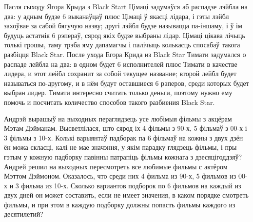 \begin{problemList}
\bigskip

\problemItemSimple
{Пасля сыходу Ягора Крыда з Black Start Цімаці задумаўся аб распадзе лэйбла на два:
у адным будзе 6 выканаўцаў плюс Цімаці ў якасці лідара, і гэты лэйбл захоўвае за сабой бягучую назву;
другі лэйбл будзе называцца па-іншаму, і ў ім будуць астатнія 6 рэпераў, сярод якіх будзе выбраны лідар.
Цімаці цікава лічыць толькі грошы, таму трэба яму дапамагчы і палічыць колькасць спосабаў такога разбіцця Black Star.}
{После ухода Егора Крида из Black Star Тимати задумался о распаде лейбла на два:
в одном будет 6 исполнителей плюс Тимати в качестве лидера, и этот лейбл сохранит за собой текущее название;
второй лейбл будет называться по-другому, и в нём будут оставшиеся 6 рэперов, среди которых будет выбран лидер.
Тимати интересно считать только деньги, поэтому нужно ему помочь и посчитать количество способов такого разбиения Black Star.}

\bigskip

\problemItemSimple
{Андрэй вырашыў на выходных пераглядзець усе любімыя фільмы з акцёрам Мэтам Дэйманам.
Высветлілася, што сярод іх 4 фільмы з 90-х, 5 фільмаў з 00-х і 3 фільмы з 10-х.
Колькі варыянтаў падборак па 6 фільмаў на кожны з двух дзён ён можа скласці,
калі не мае значэння, у якім парадку глядзець фільмы,
і пры гэтым у кожную падборку павінны патрапіць фільмы кожнага з дзесяцігоддзяў?}
{Андрей решил на выходных пересмотреть все любимые фильмы с актёром Мэттом Дэймоном.
Оказалось, что среди них 4 фильма из 90-х, 5 фильмов из 00-х и 3 фильма из 10-х.
Сколько вариантов подборок по 6 фильмов на каждый из двух дней он может составить,
если не имеет значения, в каком порядке смотреть фильмы,
и при этом в каждую подборку должны попасть фильмы каждого из десятилетий?}

\end{problemList}

